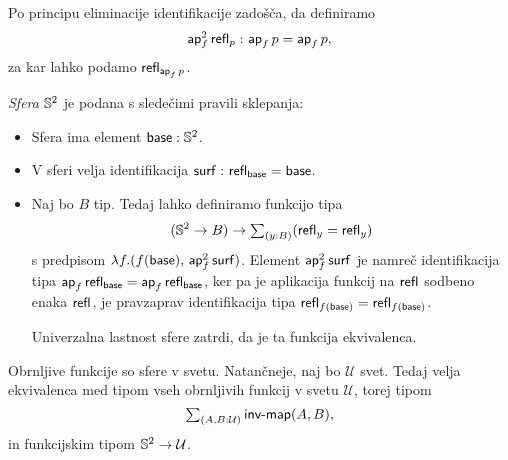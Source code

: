 \begin{dokaz}
  Po principu eliminacije identifikacije zadošča, da definiramo
  \[\eqtype{\typename{ap}_{f}^{2}\,\refl{p}}{\ap{f}p}{\ap{f}p},\] za kar lahko podamo
  \(\refl{\ap{f}p}\).
\end{dokaz}

\begin{definicija}
  \emph{Sfera} \(\sphere{2}\) je podana s sledečimi pravili sklepanja:
  \begin{itemize}
  \item Sfera ima element \(\typejudgment{\base}{\sphere{2}}\).
  \item V sferi velja identifikacija \(\eqtype{\surf}{\refl{\base}}{\base}\).
  \item Naj bo \(B\) tip. Tedaj lahko definiramo funkcijo tipa
    \[(\sphere{2} \to B) \to \sumtype{y}{B}{(\refl{y} = \refl{y})}\]
    s predpisom \(\lambda f. (f(\base),\, \typename{ap}_{f}^{2}\,\surf)\). Element \(\typename{ap}_{f}^{2}\,\surf\) je namreč identifikacija tipa
    \(\ap{f}\refl{\base} = \ap{f}\refl{\base}\), ker pa je aplikacija funkcij na \(\refl{}\) sodbeno enaka \(\refl{}\), je pravzaprav identifikacija tipa
    \(\refl{f(\base)} = \refl{f(\base)}\).

    Univerzalna lastnost sfere zatrdi, da je ta funkcija ekvivalenca.
  \end{itemize}
\end{definicija}

\begin{izrek}
  Obrnljive funkcije so sfere v svetu. Natančneje, naj bo \(\mathcal{U}\) svet. Tedaj velja ekvivalenca med tipom vseh obrnljivih funkcij v svetu \(\mathcal{U}\), torej tipom \[{\sumtype{A, B}{\mathcal{U}}{\invmap(A, B)}},\] in funkcijskim tipom \(\sphere{2} \to \mathcal{U}\).
\end{izrek}

